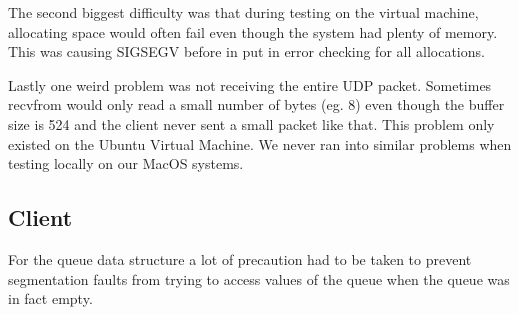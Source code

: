 \documentclass[12pt]{article}
\begin{document}
The second biggest difficulty was that during testing on the virtual machine, allocating space would often fail even though the system had plenty of memory. This was causing SIGSEGV before in put in error checking for all allocations.

Lastly one weird problem was not receiving the entire UDP packet. Sometimes recvfrom would only read a small number of bytes (eg. 8) even though the buffer size is 524 and the client never sent a small packet like that. This problem only existed on the Ubuntu Virtual Machine. We never ran into similar problems when testing locally on our MacOS systems.

\subsection{Client}


For the queue data structure a lot of precaution had to be taken to prevent segmentation faults from trying to access values of the queue when the queue was in fact empty.
\end{document}
